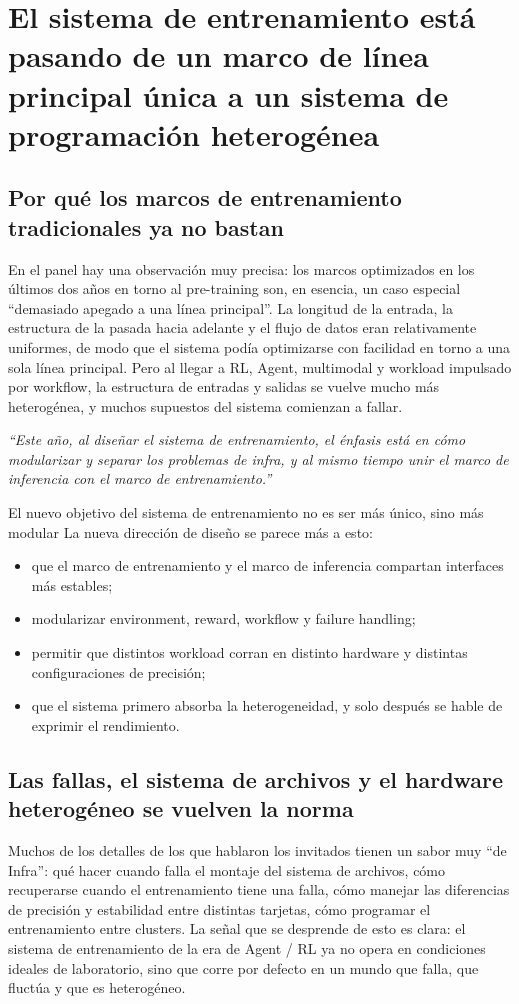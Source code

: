 \section{El sistema de entrenamiento está pasando de un marco de línea principal única a un sistema de programación heterogénea}

\subsection{Por qué los marcos de entrenamiento tradicionales ya no bastan}
En el panel hay una observación muy precisa: los marcos optimizados en los últimos dos años en torno al pre-training son, en esencia, un caso especial ``demasiado apegado a una línea principal''. La longitud de la entrada, la estructura de la pasada hacia adelante y el flujo de datos eran relativamente uniformes, de modo que el sistema podía optimizarse con facilidad en torno a una sola línea principal. Pero al llegar a RL, Agent, multimodal y workload impulsado por workflow, la estructura de entradas y salidas se vuelve mucho más heterogénea, y muchos supuestos del sistema comienzan a fallar.

\textit{``Este año, al diseñar el sistema de entrenamiento, el énfasis está en cómo modularizar y separar los problemas de infra, y al mismo tiempo unir el marco de inferencia con el marco de entrenamiento.''}

\begin{importantbox}{El nuevo objetivo del sistema de entrenamiento no es ser más único, sino más modular}
La nueva dirección de diseño se parece más a esto:
\begin{itemize}
  \item que el marco de entrenamiento y el marco de inferencia compartan interfaces más estables;
  \item modularizar environment, reward, workflow y failure handling;
  \item permitir que distintos workload corran en distinto hardware y distintas configuraciones de precisión;
  \item que el sistema primero absorba la heterogeneidad, y solo después se hable de exprimir el rendimiento.
\end{itemize}
\end{importantbox}

\subsection{Las fallas, el sistema de archivos y el hardware heterogéneo se vuelven la norma}
Muchos de los detalles de los que hablaron los invitados tienen un sabor muy ``de Infra'': qué hacer cuando falla el montaje del sistema de archivos, cómo recuperarse cuando el entrenamiento tiene una falla, cómo manejar las diferencias de precisión y estabilidad entre distintas tarjetas, cómo programar el entrenamiento entre clusters. La señal que se desprende de esto es clara: el sistema de entrenamiento de la era de Agent / RL ya no opera en condiciones ideales de laboratorio, sino que corre por defecto en un mundo que falla, que fluctúa y que es heterogéneo.

